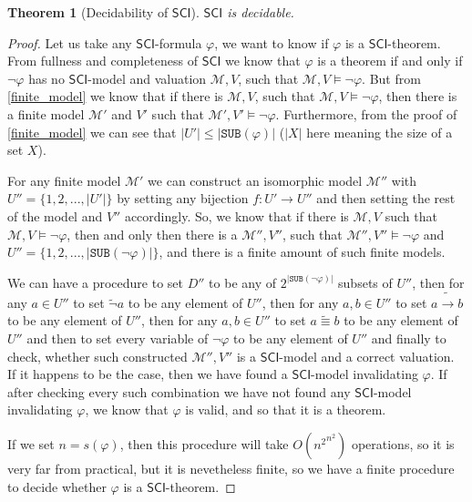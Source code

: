 \documentclass{article}
\newtheorem{theorem}{Theorem}
\theoremstyle{definition}
\theoremstyle{definition}
\newcommand*{\id}{\equiv}
\newcommand*{\ra}{\rightarrow}
\newcommand*{\SUB}{\texttt{SUB}}
\newcommand{\SCI}{$\mathsf{SCI}$\xspace}
\newcommand{\M}{\mathcal{M}\xspace}
\begin{document}
\begin{theorem}[Decidability of \SCI]
    \label{decidability}
    \SCI is decidable.
\end{theorem}
\begin{proof}
    Let us take any \SCI-formula $\varphi$, we want to know if $\varphi$ is a \SCI-theorem. From fullness and completeness of \SCI we know that $\varphi$ is a theorem if and only if $\lnot \varphi$ has no \SCI-model and valuation $\M, V$, such that $\M, V \models \lnot \varphi$. But from \cref{finite_model} we know that if there is $\M, V$, such that $\M, V \models \lnot \varphi$, then there is a finite model $\M'$ and $V'$ such that $\M', V' \models \lnot \varphi$. Furthermore, from the proof of \cref{finite_model} we can see that $|U'| \leq |\SUB(\varphi)|$ ($|X|$ here meaning the size of a set $X$).

    For any finite model $\M'$ we can construct an isomorphic model $\M''$ with
    $U'' = \{1, 2, ..., |U'|\}$ by setting any bijection $f : U' \rightarrow U''$
    and then setting the rest of the model and $V''$ accordingly. So, we know that
    if there is $\M, V$ such that $\M, V \models \lnot \varphi$, then and only then
    there is a $\M'', V''$, such that $\M'', V'' \models \lnot \varphi$ and $U'' =
        \{1, 2, ..., |\SUB(\lnot \varphi)|\}$, and there is a finite amount of such
    finite models.

    We can have a procedure to set $D''$ to be any of $2^{|\SUB(\lnot \varphi)|}$
    subsets of $U''$, then for any $a \in U''$ to set $\tilde{\lnot}a$ to be any
    element of $U''$, then for any $a, b \in U''$ to set $a \tilde{\ra} b$ to be
    any element of $U''$, then for any $a, b \in U''$ to set $a \tilde{\id} b$ to
    be any element of $U''$ and then to set every variable of $\lnot \varphi$ to be
    any element of $U''$ and finally to check, whether such constructed $\M'', V''$
    is a \SCI-model and a correct valuation. If it happens to be the case, then we
    have found a \SCI-model invalidating $\varphi$. If after checking every such
    combination we have not found any \SCI-model invalidating $\varphi$, we know
    that $\varphi$ is valid, and so that it is a theorem.

    If we set $n = s(\varphi)$, then this procedure will take $O({n^2} ^ {n^2})$
    operations, so it is very far from practical, but it is nevetheless finite, so
    we have a finite procedure to decide whether $\varphi$ is a \SCI-theorem.

\end{proof}
\end{document}
